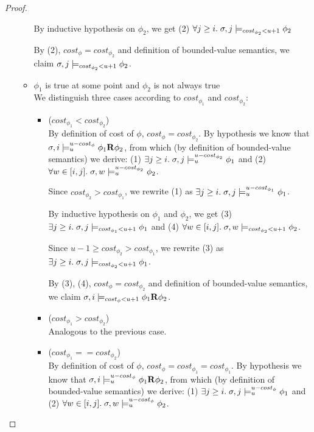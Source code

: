 \begin{theorem}
\begin{lemma}
\begin{proof}
\begin{itemize}
\begin{itemize}
        By inductive hypothesis on $\phi_2$, we get (2) $\forall j \geq i.\; \sigma,j \models_{cost_{\phi_2} < u + 1} \phi_2$

        By (2), $cost_\phi = cost_{\phi_2}$ and definition of bounded-value semantics, we claim $\sigma,j \models_{cost_{\phi_2} < u + 1} \phi_2$.

        \item $\phi_1$ is true at some point and $\phi_2$ is not always true \\
        We distinguish three cases according to $cost_{\phi_1}$ and $cost_{\phi_2}$:
        \begin{itemize}
            \item ($cost_{\phi_1} < cost_{\phi_2}$) \\
            By definition of cost of $\phi$, $cost_\phi = cost_{\phi_2}$.
            By hypothesis we know that $\sigma,i \models_{u}^{u-cost_\phi} \phi_1 \mathbf{R} \phi_2$, from which (by definition of bounded-value semantics) we derive: 
            (1) $\exists j \geq i.\; \sigma,j \models_{u}^{u-cost_{\phi_2}} \phi_1$ and 
            (2) $\forall w \in[i,j].\; \sigma,w \models_{u}^{u-cost_{\phi_2}} \phi_2$.

            Since $cost_{\phi_2} > cost_{\phi_1}$, we rewrite (1) as $\exists j \geq i.\; \sigma,j \models_{u}^{u-cost_{\phi_1}} \phi_1$. 

            By inductive hypothesis on $\phi_1$ and $\phi_2$, we get (3) $\exists j \geq i.\; \sigma,j \models_{cost_{\phi_1} < u + 1} \phi_1$ and (4) $\forall w \in[i,j].\; \sigma,w \models_{cost_{\phi_2} < u + 1} \phi_2$.

            Since $u-1 \geq cost_{\phi_2} > cost_{\phi_1}$, we rewrite (3) as $\exists j \geq i.\; \sigma,j \models_{cost_{\phi_2} < u + 1} \phi_1$.

            By (3), (4), $cost_\phi = cost_{\phi_2}$ and definition of bounded-value semantics, we claim $\sigma,i \models_{cost_\phi < u + 1} \phi_1 \mathbf{R} \phi_2$.
            
            \item ($cost_{\phi_1} > cost_{\phi_2}$) \\
            Analogous to the previous case.
            
            \item ($cost_{\phi_1} == cost_{\phi_2}$) \\
            By definition of cost of $\phi$, $cost_\phi = cost_{\phi_1} = cost_{\phi_1}$.
            By hypothesis we know that $\sigma,i \models_{u}^{u-cost_\phi} \phi_1 \mathbf{R} \phi_2$, from which (by definition of bounded-value semantics) we derive: 
            (1) $\exists j \geq i.\; \sigma,j \models_{u}^{u-cost_\phi} \phi_1$ and 
            (2) $\forall w \in[i,j].\; \sigma,w \models_{u}^{u-cost_\phi} \phi_2$.


\end{itemize}
\end{itemize}
\end{itemize}
\end{proof}
\end{lemma}
\end{theorem}
